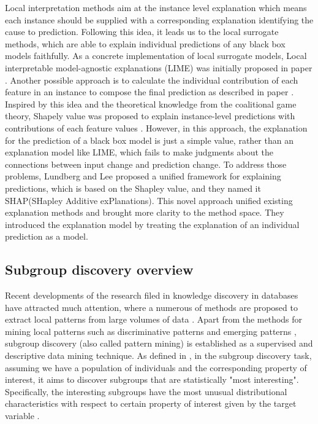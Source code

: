 Local interpretation methods aim at the instance level explanation which means each instance should be supplied with a corresponding explanation identifying the cause to prediction. Following this idea, it leads us to the local surrogate methods, which are able to explain individual predictions of any black box models faithfully. As a concrete implementation of local surrogate models, Local interpretable model-agnostic explanations (LIME) was initially proposed in paper \cite{ribeiro2016should}. Another possible approach is to calculate the individual contribution of each feature in an instance to compose the final prediction as described in paper \cite{robnik2008explaining}. Inspired by this idea and the theoretical knowledge from the coalitional game theory, Shapely value was proposed to explain instance-level predictions with contributions of each feature values \cite{kononenko2010efficient}. However, in this approach, the explanation for the prediction of a black box model is just a simple value, rather than an explanation model like LIME, which fails to make judgments about the connections between input change and prediction change. To address those problems, Lundberg and Lee \cite{lundberg2017unified} proposed a unified framework for explaining predictions, which is based on the Shapley value, and they named it SHAP(SHapley Additive exPlanations). This novel approach unified existing explanation methods and brought more clarity to the method space. They introduced the explanation model by treating the explanation of an individual prediction as a model.



\subsection{Subgroup discovery overview}

Recent developments of the research filed in knowledge discovery in databases have attracted much attention, where a numerous of methods are proposed to extract local patterns from large volumes of data  \cite{fayyad1996data}. Apart from the methods for mining local patterns such as discriminative patterns \cite{cheng2008direct} and emerging patterns \cite{dong1999efficient}, subgroup discovery (also called pattern mining) is established as a supervised and descriptive data mining technique. As defined in \cite{herrera2011overview}, in the subgroup discovery task, assuming we have a population of individuals and the corresponding property of interest, it aims to discover subgroups that are statistically "most interesting". Specifically, the interesting subgroups have the most unusual distributional characteristics with respect to certain property of interest given by the target variable \cite{atzmueller2009fast}.

